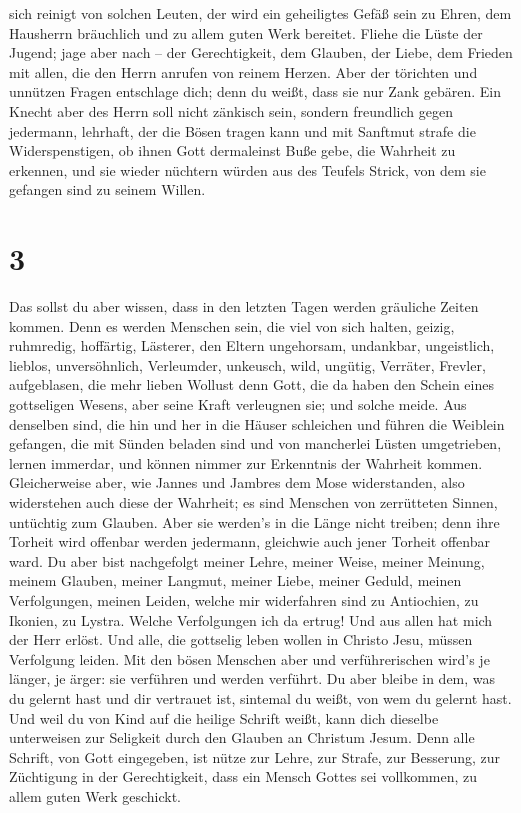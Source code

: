 sich reinigt von solchen Leuten, der wird ein geheiligtes Gefäß sein zu
Ehren, dem Hausherrn bräuchlich und zu allem guten Werk bereitet.
 Fliehe die Lüste der Jugend; jage aber nach -- der
Gerechtigkeit, dem Glauben, der Liebe, dem Frieden mit allen, die den
Herrn anrufen von reinem Herzen.  Aber der törichten und
unnützen Fragen entschlage dich; denn du weißt, dass sie nur Zank
gebären.  Ein Knecht aber des Herrn soll nicht zänkisch
sein, sondern freundlich gegen jedermann, lehrhaft, der die Bösen tragen
kann  und mit Sanftmut strafe die Widerspenstigen, ob
ihnen Gott dermaleinst Buße gebe, die Wahrheit zu erkennen,
 und sie wieder nüchtern würden aus des Teufels Strick,
von dem sie gefangen sind zu seinem Willen.

\hypertarget{section-2}{%
\section{3}\label{section-2}}

 Das sollst du aber wissen, dass in den letzten Tagen
werden gräuliche Zeiten kommen.  Denn es werden Menschen
sein, die viel von sich halten, geizig, ruhmredig, hoffärtig, Lästerer,
den Eltern ungehorsam, undankbar, ungeistlich,  lieblos,
unversöhnlich, Verleumder, unkeusch, wild, ungütig, 
Verräter, Frevler, aufgeblasen, die mehr lieben Wollust denn Gott,
 die da haben den Schein eines gottseligen Wesens, aber
seine Kraft verleugnen sie; und solche meide.  Aus
denselben sind, die hin und her in die Häuser schleichen und führen die
Weiblein gefangen, die mit Sünden beladen sind und von mancherlei Lüsten
umgetrieben,  lernen immerdar, und können nimmer zur
Erkenntnis der Wahrheit kommen.  Gleicherweise aber, wie
Jannes und Jambres dem Mose widerstanden, also widerstehen auch diese
der Wahrheit; es sind Menschen von zerrütteten Sinnen, untüchtig zum
Glauben.  Aber sie werden's in die Länge nicht treiben;
denn ihre Torheit wird offenbar werden jedermann, gleichwie auch jener
Torheit offenbar ward.  Du aber bist nachgefolgt meiner
Lehre, meiner Weise, meiner Meinung, meinem Glauben, meiner Langmut,
meiner Liebe, meiner Geduld,  meinen Verfolgungen, meinen
Leiden, welche mir widerfahren sind zu Antiochien, zu Ikonien, zu
Lystra. Welche Verfolgungen ich da ertrug! Und aus allen hat mich der
Herr erlöst.  Und alle, die gottselig leben wollen in
Christo Jesu, müssen Verfolgung leiden.  Mit den bösen
Menschen aber und verführerischen wird's je länger, je ärger: sie
verführen und werden verführt.  Du aber bleibe in dem,
was du gelernt hast und dir vertrauet ist, sintemal du weißt, von wem du
gelernt hast.  Und weil du von Kind auf die heilige
Schrift weißt, kann dich dieselbe unterweisen zur Seligkeit durch den
Glauben an Christum Jesum.  Denn alle Schrift, von Gott
eingegeben, ist nütze zur Lehre, zur Strafe, zur Besserung, zur
Züchtigung in der Gerechtigkeit,  dass ein Mensch Gottes
sei vollkommen, zu allem guten Werk geschickt.

